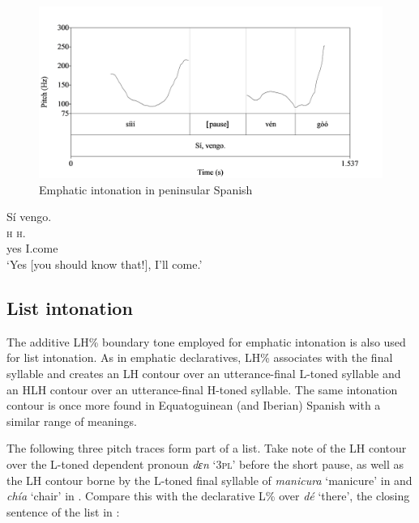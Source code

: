 \begin{figure}
\caption{Emphatic intonation in peninsular Spanish}
\label{fig:key:3.35}
\includegraphics[height=.3\textheight]{figures/yakpomod-img37.png}
\end{figure}
 


\ea%
    \label{ex:key:88}
    \glll   Sí    vengo.\\
\textsc{h}  \textsc{h.}\\
yes    I.come\\
\glt ‘Yes [you should know that!], I’ll come.’
\z

\subsection{List intonation}\label{sec:3.4.3}

The additive LH\% boundary tone employed for emphatic intonation is also used for list intonation. As in emphatic declaratives, LH\% associates with the final syllable and creates an LH contour over an utterance-final L-toned syllable and an HLH contour over an utterance-final H-toned syllable. The same intonation contour is once more found in Equatoguinean (and Iberian) Spanish with a similar range of meanings.


The following three pitch traces form part of a list. Take note of the LH contour over the L-toned dependent pronoun \textit{dɛn} ‘\textsc{3pl}’ before the short pause, as well as the LH contour borne by the L-toned final syllable of \textit{manicura} ‘manicure’ in  and \textit{chía} ‘chair’ in . Compare this with the declarative L\% over \textit{dé} ‘there’, the closing sentence of the list in : 


